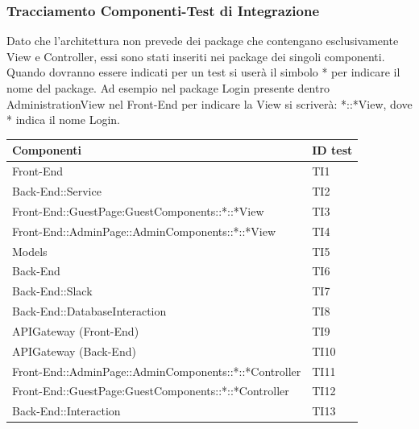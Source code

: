 \documentclass[../PianoDiQualifica_v4.0.0.tex]{subfiles}
\begin{document}
	\subsubsection{Tracciamento Componenti-Test di Integrazione}
	Dato che l'architettura non prevede dei package che contengano esclusivamente View e Controller, essi sono stati inseriti nei package dei singoli componenti. Quando dovranno essere indicati per un test si userà il simbolo * per indicare il nome del package. Ad esempio nel package Login presente dentro AdministrationView nel Front-End per indicare la View si scriverà: *::*View, dove * indica il nome Login.
	\begin{longtable}[c] { >{\centering\arraybackslash}p{11cm} >{\centering\arraybackslash}p{2cm}}
		\toprule
		\centerline{\textbf{Componenti}} & \centerline{\textbf{ID test}} \\
			\midrule
			Front-End & TI1 \\
			\addlinespace[0.3em]
			\midrule
			\addlinespace[0.3em]
			Back-End::Service & TI2 \\
			\addlinespace[0.3em]
			\midrule
			\addlinespace[0.3em]
			Front-End::GuestPage:GuestComponents::*::*View & TI3 \\
			\addlinespace[0.3em]
			\midrule
			\addlinespace[0.3em]
			Front-End::AdminPage::AdminComponents::*::*View & TI4\\
			\addlinespace[0.3em]
			\midrule
			\addlinespace[0.3em]
			Models & TI5\\
			\addlinespace[0.3em]
			\midrule
			\addlinespace[0.3em]
			Back-End & TI6\\
			\addlinespace[0.3em]
			\midrule
			\addlinespace[0.3em]
			Back-End::Slack & TI7\\
			\addlinespace[0.3em]
			\midrule
			\addlinespace[0.3em]
			Back-End::DatabaseInteraction & TI8 \\
			\addlinespace[0.3em]
			\midrule
			\addlinespace[0.3em]
			APIGateway (Front-End) & TI9\\
			\addlinespace[0.3em]
			\midrule
			\addlinespace[0.3em]
			APIGateway (Back-End) & TI10\\
			\addlinespace[0.3em]
			\midrule
			\addlinespace[0.3em]
			Front-End::AdminPage::AdminComponents::*::*Controller & TI11\\
			\addlinespace[0.3em]
			\midrule
			\addlinespace[0.3em]
			Front-End::GuestPage:GuestComponents::*::*Controller & TI12\\
			\addlinespace[0.3em]
			\midrule
			\addlinespace[0.3em]
			Back-End::Interaction & TI13 \\

\end{longtable}
\end{document}
